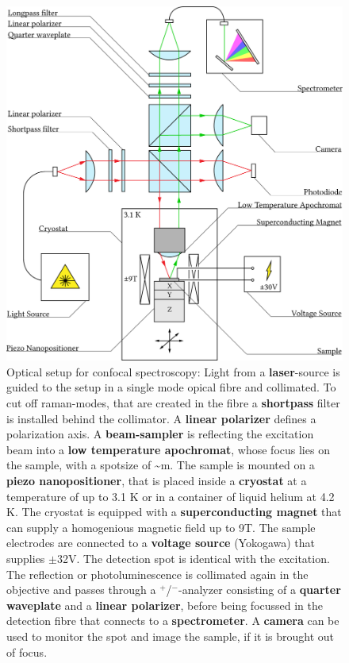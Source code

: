 \begin{figure}
	\centering
	\includegraphics[width=.8\textwidth]{OptischerAufbau.png}
	\caption{Optical setup for confocal spectroscopy: Light from a \textbf{laser}-source is guided to the setup in a single mode opical fibre and collimated. To cut off raman-modes, that are created in the fibre a \textbf{shortpass} filter is installed behind the collimator. A \textbf{linear polarizer} defines a polarization axis. A \textbf{beam-sampler} is reflecting the excitation beam into a \textbf{low temperature apochromat}, whose focus lies on the sample, with a spotsize of \textasciitilde{}\mu m. The sample is mounted on a \textbf{piezo nanopositioner}, that is placed inside a \textbf{cryostat} at a temperature of up to 3.1 K or in a container of liquid helium at 4.2 K. The cryostat is equipped with a \textbf{superconducting magnet} that can supply a homogenious magnetic field up to 9T. The sample electrodes are connected to a \textbf{voltage source} (Yokogawa) that supplies {\small$\pm$}32V. The detection spot is identical with the excitation. The reflection or photoluminescence is collimated again in the objective and passes through a \sigma$^+$/\sigma$^-$-analyzer consisting of a \textbf{quarter waveplate} and a \textbf{linear polarizer}, before being focussed in the detection fibre that connects to a \textbf{spectrometer}. A \textbf{camera} can be used to monitor the spot and image the sample, if it is brought out of focus.}
	\label{opticalsetup}
\end{figure}

